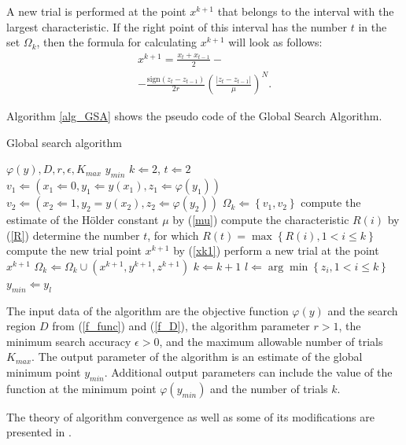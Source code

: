 \documentclass[iicol]{sn-jnl}
\theoremstyle{thmstyleone}%
\theoremstyle{thmstyletwo}%
\theoremstyle{thmstylethree}%
\begin{document}
A new trial is performed at the point $x^{k+1}$ that belongs to the interval
with the largest characteristic. If the right point of this interval has the number $t$ in the set $\Omega_k$, then the formula for calculating $x^{k+1}$ will look as follows:
\begin{multline}\label{xk1}
x^{k+1}=\frac{x_t+x_{t-1}}{2}-\\
-\frac{\mathrm{sign}(z_t-z_{t-1})}{2r}\left(\frac{\left|z_t-z_{t-1}\right|}{\mu}\right)^N.   
\end{multline}

Algorithm \ref{alg_GSA} shows the pseudo code of the Global Search Algorithm. 

\begin{algorithm}
\caption{Global search algorithm}\label{alg_GSA}
\begin{algorithmic}[1]
\Require $\varphi(y), D, r, \epsilon, K_{max}$
\Ensure $y_{min}$
\State $k \Leftarrow 2$, $t \Leftarrow 2$
\State $v_1 \Leftarrow (x_1 \Leftarrow 0, y_1 \Leftarrow y(x_1), z_1 \Leftarrow \varphi(y_1))$
\State $v_2 \Leftarrow (x_2 \Leftarrow 1, y_2=y(x_2), z_2 \Leftarrow \varphi(y_2))$
\State $\Omega_k \Leftarrow \left\{ v_1, v_2 \right\}$
    \State compute the estimate of the H\"older constant $\mu$ by (\ref{mu})
        \State compute the characteristic $R(i)$ by (\ref{R})
    \EndFor
    \State determine the number $t$, for which $R(t) = \max \left\{ R(i), 1 < i \leq k \right\}$
    \State compute the new trial point $x^{k+1}$ by (\ref{xk1})
    \State perform a new trial at the point $x^{k+1}$
    \State $\Omega_k \Leftarrow \Omega_k \cup (x^{k+1}, y^{k+1}, z^{k+1})$
    \State $k \Leftarrow k + 1$
\EndWhile
\State $l \Leftarrow \arg \min \left\{ z_i, 1 < i \leq k \right\}$
\State $y_{min} \Leftarrow y_l$
\State {}
\end{algorithmic}
\end{algorithm} 

The input data of the algorithm are the objective function $\varphi(y)$ and the search region $D$ from (\ref{f_func}) and (\ref{f_D}), the algorithm parameter $r>1$, the minimum search accuracy $\epsilon > 0$, and the maximum allowable number of trials $K_{max}$. The output parameter of the algorithm is an estimate of the global minimum point $y_{min}$. Additional output parameters can include the value of the function at the minimum point $\varphi(y_{min})$ and the number of trials $k$.

The theory of algorithm convergence as well as some of its modifications are presented in \citet{Strongin2000}.
\end{document}
